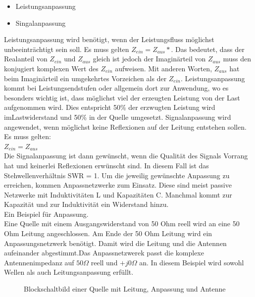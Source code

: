 \begin{itemize}
\item 	Leistungsanpassung
\item 	Singalanpassung
\end{itemize}
Leistungsanpassung wird benötigt, wenn der Leistungsfluss möglichst unbeeinträchtigt sein soll. Es muss gelten
$Z_{ein}=Z_{aus}*$.
Das bedeutet, dass der Realanteil von $Z_{ein}$ und $Z_{aus}$ gleich ist jedoch der Imaginärteil von $Z_{aus}$ muss den konjugiert komplexen Wert des $Z_{ein}$ aufweisen. Mit anderen Worten, $Z_{aus}$ hat beim Imaginärteil ein umgekehrtes Vorzeichen als der $Z_{ein}$. Leistungsanpassung kommt bei Leistungsendstufen oder allgemein dort zur Anwendung, wo es besonders wichtig ist, dass möglichst viel der erzeugten Leistung von der Last aufgenommen wird. Dies entspricht  50\% der erzwugten Leistung wird imLastwiderstand und 50\% in der Quelle umgesetzt.
Signalanpassung wird angewendet, wenn möglichst keine Reflexionen auf der Leitung entstehen sollen. Es muss gelten:\\
$Z_{ein}=Z_{aus}$\\%
Die Signalanpassung ist dann gewünscht, wenn die Qualität des Signals Vorrang hat und keinerlei Reflexionen erwünscht sind. In diesem Fall ist das Stehwellenverhältnis SWR = 1.
Um die jeweilig gewünschte Anpassung zu erreichen, kommen Anpassnetzwerke zum Einsatz. Diese sind meist passive Netzwerke mit Induktivitäten L und Kapazitäten C. Manchmal kommt zur Kapazität und zur Induktivität ein Widerstand hinzu.\\
Ein Beispiel für Anpassung.\\
Eine Quelle mit einem Ausgangswiderstand von  50 Ohm reell wird an eine 50 Ohm Leitung angeschlossen. Am Ende der 50 Ohm Leitung wird ein  Anpassungsnetzwerk benötigt. Damit wird die Leitung und die Antennen aufeinander abgestimmt.Das Anpassnetzwerek passt die komplexe Antennenimpedanz auf $50\Omega$ reell und $+j0\Omega$ an. In diesem Beispiel wird sowohl Wellen als auch Leitungsanpassung erfüllt.\\


\begin{figure}[h]
	\begin{center}
	\end{center}
\caption{Blockschaltbild einer  Quelle mit Leitung, Anpassung und Antenne}
\label{Anpassung}
\end{figure}

